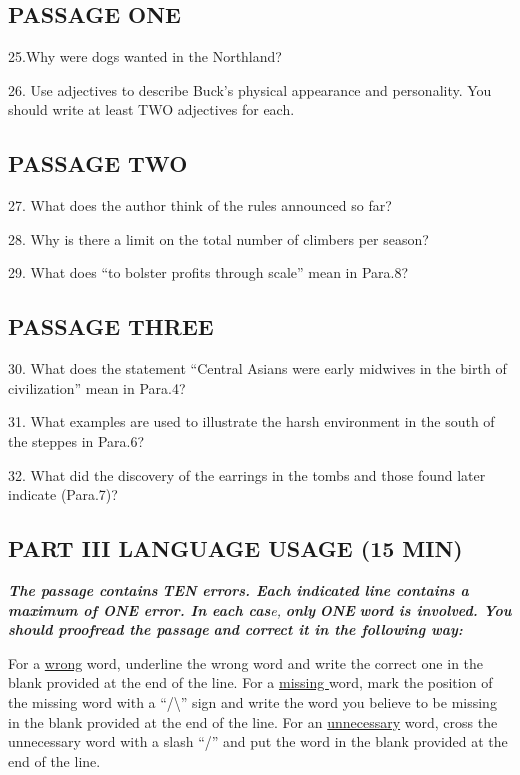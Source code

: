 \documentclass[UTF8,11pt]{ctexart}
\begin{document}
\subsection*{\textbf{PASSAGE ONE}}


25.Why were dogs wanted in the Northland?


26. Use adjectives to describe Buck’s physical appearance and personality. You should write at least TWO adjectives for each.


\subsection*{\textbf{PASSAGE TWO}}


27. What does the author think of the rules announced so far?


28. Why is there a limit on the total number of climbers per season?


29. What does “to bolster profits through scale” mean in Para.8?


\subsection*{\textbf{PASSAGE THREE}}


30. What does the statement “Central Asians were early midwives in the birth of civilization” mean in Para.4?


31. What examples are used to illustrate the harsh environment in the south of the steppes in Para.6?


32. What did the discovery of the earrings in the tombs and those found later indicate (Para.7)?


\subsection*{\textbf{PART III LANGUAGE USAGE (15 MIN)}}


\textbf{\textit{The passage contains}} \textbf{\textit{TEN errors. Each indicated line contains a maximum of ONE error. In each cas}}\textit{e, }\textbf{\textit{only}} \textbf{\textit{ONE}} \textbf{\textit{word is involved. You should proofread the passage}} \textbf{\textit{and correct it in the following way:}}


For a \uline{wrong} word, underline the wrong word and write the correct one in the blank provided at the end of the line. For a \uline{missing }word, mark the position of the missing word with a “/\textbackslash{}” sign and write the word you believe to be missing in the blank provided at the end of the line. For an \uline{unnecessary} word, cross the unnecessary word with a slash “/” and put the word in the blank provided at the end of the line.
\end{document}
